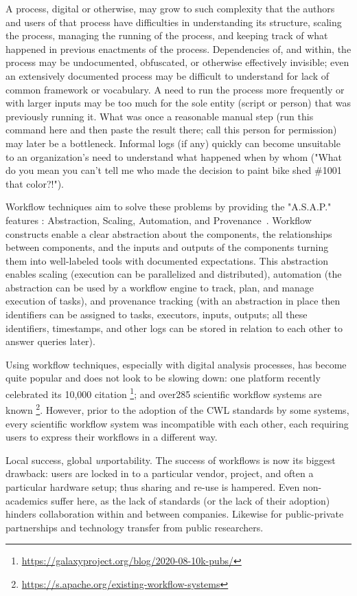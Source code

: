 \documentclass[sigconf,authordraft]{acmart}
\begin{document}
A process, digital or otherwise, may grow to such complexity that the
authors and users of that process have difficulties in understanding its
structure, scaling the process, managing the running of the process, and
keeping track of what happened in previous enactments of the process.
Dependencies of, and within, the process may be undocumented,
obfuscated, or otherwise effectively invisible; even an extensively
documented process may be difficult to understand for lack of common
framework or vocabulary. A need to run the process more frequently or
with larger inputs may be too much for the sole entity (script or
person) that was previously running it. What was once a reasonable
manual step (run this command here and then paste the result there; call
this person for permission) may later be a bottleneck. Informal logs (if
any) quickly can become unsuitable to an organization's need to
understand what happened when by whom ("What do you mean you can't
tell me who made the decision to paint bike shed \#1001 that
color?!").

Workflow techniques aim to solve these problems by providing the
"A.S.A.P." features : Abstraction, Scaling, Automation, and Provenance~\cite{cuevas-vicenttin_scientific_2012}. Workflow constructs enable a clear abstraction about the
components, the relationships between components, and the inputs and
outputs of the components turning them into well-labeled tools with
documented expectations. This abstraction enables scaling (execution can
be parallelized and distributed), automation (the abstraction can be
used by a workflow engine to track, plan, and manage execution of
tasks), and provenance tracking (with an abstraction in place then
identifiers can be assigned to tasks, executors, inputs, outputs; all
these identifiers, timestamps, and other logs can be stored in relation
to each other to answer queries later).

Using workflow techniques, especially with digital analysis processes,
has become quite popular and does not look to be slowing down: one
platform recently celebrated its 10,000
citation \footnote{\url{https://galaxyproject.org/blog/2020-08-10k-pubs/}};
and over285 scientific workflow systems are known \footnote{\url{https://s.apache.org/existing-workflow-systems}}.
However,
prior to the adoption of the CWL standards by some systems, every
scientific workflow system was incompatible with each other, each
requiring users to express their workflows in a different way.

Local success, global \textit{un}portability. The success of workflows
is now its biggest drawback: users are locked in to a particular
vendor, project, and often a particular hardware setup; thus sharing
and re-use is hampered. Even non-academics suffer here, as the lack of
standards (or the lack of their adoption) hinders collaboration within
and between companies. Likewise for public-private partnerships and
technology transfer from public researchers.
\end{document}
